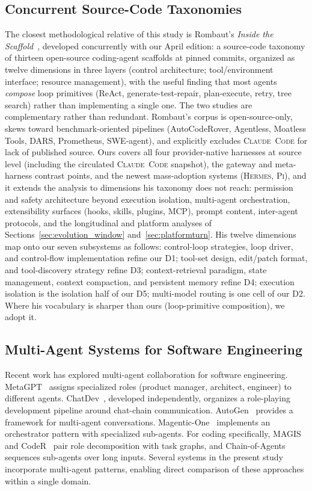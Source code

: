 \documentclass[11pt,a4paper]{article}
\newcommand{\clcode}{\textsc{Claude~Code}\xspace}
\newcommand{\hrm}{\textsc{Hermes}\xspace}
\newcommand{\pib}{\textsc{Pi}\xspace}
\begin{document}
\subsection{Concurrent Source-Code Taxonomies}
\label{sec:related_taxonomies}

The closest methodological relative of this study is Rombaut's \emph{Inside the Scaffold}~\cite{rombaut2026}, developed concurrently with our April edition: a source-code taxonomy of thirteen open-source coding-agent scaffolds at pinned commits, organized as twelve dimensions in three layers (control architecture; tool/environment interface; resource management), with the useful finding that most agents \emph{compose} loop primitives (ReAct, generate-test-repair, plan-execute, retry, tree search) rather than implementing a single one.
The two studies are complementary rather than redundant.
Rombaut's corpus is open-source-only, skews toward benchmark-oriented pipelines (AutoCodeRover, Agentless, Moatless Tools, DARS, Prometheus, SWE-agent), and explicitly excludes \clcode{} for lack of published source.
Ours covers all four provider-native harnesses at source level (including the circulated \clcode{} snapshot), the gateway and meta-harness contrast points, and the newest mass-adoption systems (\hrm{}, \pib{}), and it extends the analysis to dimensions his taxonomy does not reach: permission and safety architecture beyond execution isolation, multi-agent orchestration, extensibility surfaces (hooks, skills, plugins, MCP), prompt content, inter-agent protocols, and the longitudinal and platform analyses of Sections~\ref{sec:evolution_window} and~\ref{sec:platformturn}.
His twelve dimensions map onto our seven subsystems as follows: control-loop strategies, loop driver, and control-flow implementation refine our D1; tool-set design, edit/patch format, and tool-discovery strategy refine D3; context-retrieval paradigm, state management, context compaction, and persistent memory refine D4; execution isolation is the isolation half of our D5; multi-model routing is one cell of our D2.
Where his vocabulary is sharper than ours (loop-primitive composition), we adopt it.

\subsection{Multi-Agent Systems for Software Engineering}

Recent work has explored multi-agent collaboration for software engineering.
MetaGPT~\cite{hong2024metagpt} assigns specialized roles (product manager, architect, engineer) to different agents.
ChatDev~\cite{qian2024chatdev}, developed independently, organizes a role-playing development pipeline around chat-chain communication.
AutoGen~\cite{wu2023autogen} provides a framework for multi-agent conversations.
Magentic-One~\cite{fourney2024magneticone} implements an orchestrator pattern with specialized sub-agents.
For coding specifically, MAGIS~\cite{tao2024magis} and CodeR~\cite{chen2024coder} pair role decomposition with task graphs, and Chain-of-Agents~\cite{zhang2024chainofagents} sequences sub-agents over long inputs.
Several systems in the present study incorporate multi-agent patterns, enabling direct comparison of these approaches within a single domain.
\end{document}
